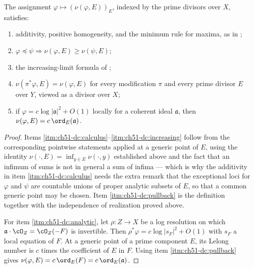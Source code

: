 \begin{proposition}\label{prop:ch51-divisorial-calculus}
The assignment $\varphi\mapsto(\nu(\varphi,E))_E$, indexed by the prime
divisors over $X$, satisfies:
\begin{enumerate}
\item\label{itm:ch51-dc:calculus}
      additivity, positive homogeneity, and the minimum rule for maxima,
      as in ;
\item\label{itm:ch51-dc:monotone}
      $\varphi\preceq\psi\Rightarrow\nu(\varphi,E)\geq\nu(\psi,E)$;
\item\label{itm:ch51-dc:increasing}
      the increasing-limit formula of ;
\item\label{itm:ch51-dc:pullback}
      $\nu(\pi^*\varphi,E)=\nu(\varphi,E)$ for every modification
      $\pi$ and every prime divisor $E$ over $Y$, viewed as a
      divisor over $X$;
\item\label{itm:ch51-dc:analytic}
      if $\varphi=c\log|\mathfrak a|^2+O(1)$ locally for a coherent
      ideal $\mathfrak a$, then
      $\nu(\varphi,E)=c\,\ord_E(\mathfrak a)$.
\end{enumerate}
\end{proposition}

\begin{proof}
Items \cref{itm:ch51-dc:calculus}--\cref{itm:ch51-dc:increasing} follow from
the corresponding pointwise statements applied at a generic point of
$E$, using the identity $\nu(\cdot,E)=\inf_{y\in E}\nu(\cdot,y)$
established above and the fact that an infimum of sums is not in general a
sum of infima --- which is why the additivity in item
\cref{itm:ch51-dc:calculus} needs the extra remark that the exceptional
loci for $\varphi$ and $\psi$ are countable unions of proper analytic
subsets of $E$, so that a common generic point may be chosen.  Item
\cref{itm:ch51-dc:pullback} is the definition together with the
independence of realization proved above.

For item \cref{itm:ch51-dc:analytic}, let $\rho:Z\to X$ be a log
resolution on which $\mathfrak a\cdot\cO_Z=\cO_Z(-F)$ is invertible.
Then $\rho^*\varphi=c\log|s_F|^2+O(1)$ with $s_F$ a local equation of
$F$.  At a generic point of a prime component $E$, its Lelong
number is $c$ times the coefficient of $E$ in $F$.  Using item
\cref{itm:ch51-dc:pullback} gives
$\nu(\varphi,E)=c\,\ord_E(F)=c\,\ord_E(\mathfrak a)$.
\end{proof}

